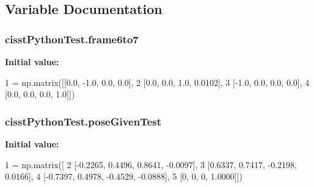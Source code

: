 \subsection{Variable Documentation}
\subsubsection[{\texorpdfstring{frame6to7}{frame6to7}}]{\setlength{\rightskip}{0pt plus 5cm}cisst\+Python\+Test.\+frame6to7}\hypertarget{namespacecisstPythonTest_adf2b9d1b5679e4c1f85c8f699ada427d}{}\label{namespacecisstPythonTest_adf2b9d1b5679e4c1f85c8f699ada427d}
{\bfseries Initial value\+:}
\begin{DoxyCode}
1 = np.matrix([[0.0, -1.0, 0.0, 0.0],
2                      [0.0,  0.0, 1.0, 0.0102],
3                      [-1.0, 0.0, 0.0, 0.0],
4                      [0.0,  0.0, 0.0, 1.0]])
\end{DoxyCode}
\subsubsection[{\texorpdfstring{pose\+Given\+Test}{poseGivenTest}}]{\setlength{\rightskip}{0pt plus 5cm}cisst\+Python\+Test.\+pose\+Given\+Test}\hypertarget{namespacecisstPythonTest_a8494e337fca5647d94e7e403d9685ee1}{}\label{namespacecisstPythonTest_a8494e337fca5647d94e7e403d9685ee1}
{\bfseries Initial value\+:}
\begin{DoxyCode}
1 = np.matrix([
2     [-0.2265,    0.4496,    0.8641,   -0.0097],
3     [0.6337,    0.7417,   -0.2198,    0.0166],
4     [-0.7397,    0.4978,   -0.4529,   -0.0888],
5          [0,         0,         0,    1.0000]])
\end{DoxyCode}
